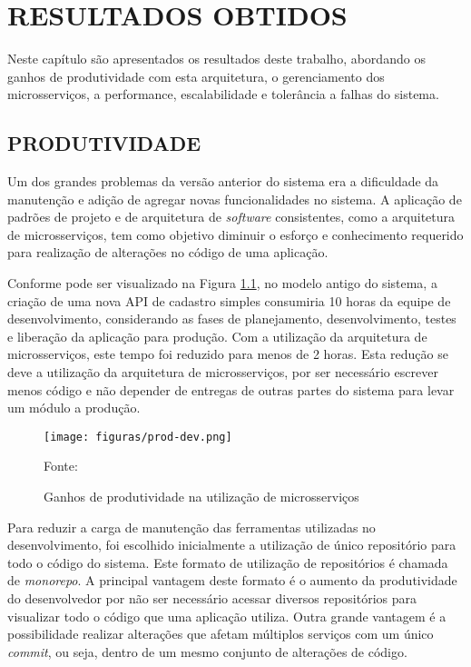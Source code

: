 \chapter{RESULTADOS OBTIDOS}
\label{chp:resultados}

Neste capítulo são apresentados os resultados deste trabalho, abordando os
ganhos de produtividade com esta arquitetura, o gerenciamento dos
microsserviços, a performance, escalabilidade e tolerância a falhas do sistema.

\section{PRODUTIVIDADE}

Um dos grandes problemas da versão anterior do sistema era a dificuldade da
manutenção e adição de agregar novas funcionalidades no sistema. A aplicação
de padrões de projeto e de arquitetura de \emph{software} consistentes,
como a arquitetura de microsserviços, tem como objetivo diminuir o esforço
e conhecimento requerido para realização de alterações no código
de uma aplicação.

Conforme pode ser visualizado na Figura \ref{fig:prod-dev}, no modelo antigo
do sistema, a criação de uma nova \ac{API} de cadastro simples consumiria
10 horas da equipe de desenvolvimento, considerando as fases de planejamento,
desenvolvimento, testes e liberação da aplicação para produção. Com a
utilização da arquitetura de microsserviços, este tempo foi reduzido para
menos de 2 horas. Esta redução se deve a utilização da arquitetura de
microsserviços, por ser necessário escrever menos código e não depender
de entregas de outras partes do sistema para levar um módulo a produção.

\begin{figure}[H]
	\centering
	\caption{Ganhos de produtividade na utilização de microsserviços}
	\texttt{[image: figuras/prod-dev.png]}

	\label{fig:prod-dev}
	\footnotesize Fonte: \fonteOAutor
\end{figure}

Para reduzir a carga de manutenção das ferramentas utilizadas no
desenvolvimento, foi escolhido inicialmente a utilização de único
repositório para todo o código do sistema. Este formato de utilização de
repositórios é chamada de \emph{monorepo}. A principal vantagem deste
formato é o aumento da produtividade do desenvolvedor por não ser necessário
acessar diversos repositórios para visualizar todo o código que uma aplicação
utiliza. Outra grande vantagem é a possibilidade realizar alterações que afetam
múltiplos serviços com um único \emph{commit}, ou seja, dentro de um mesmo
conjunto de alterações de código.

